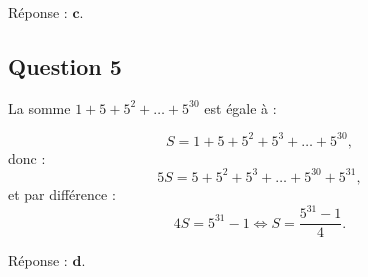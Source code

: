 \documentclass[10pt]{article}
\begin{document}
Réponse : \(\textbf{c.}\)

\subsection*{Question 5}

La somme \( 1 + 5 + 5^2 + \dots + 5^{30} \) est égale à :

\[
S= 1 + 5 + 5^2 + 5^3 + \dots + 5^{30},
\]
donc :
\[
5S = 5 + 5^2 + 5^3 + \dots + 5^{30} + 5^{31},
\]
et par différence :
\[
4S = 5^{31} - 1 \iff S = \dfrac{5^{31} - 1}{4}.
\]

Réponse : \(\textbf{d.}\)
\end{document}
